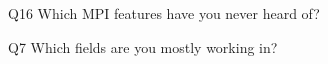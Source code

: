 \begin{description}%
\item{Q16} Which MPI features have you never heard of?%
\item{Q7} Which fields are you mostly working in?%
\end{description}%
